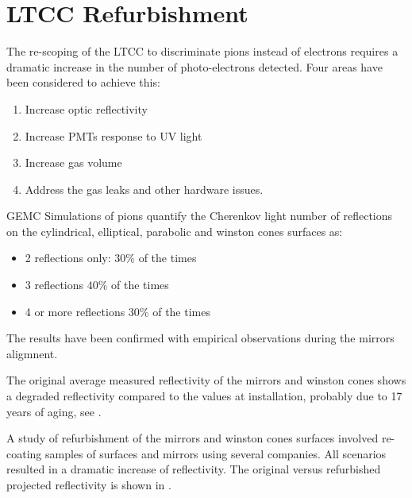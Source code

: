 \section{LTCC Refurbishment}


The re-scoping of the LTCC to discriminate pions instead of electrons requires a dramatic increase in the
number of photo-electrons detected. Four areas have been considered to achieve this:

\begin{enumerate}
	\item Increase optic reflectivity
	\item Increase PMTs response to UV light
	\item Increase gas volume
	\item Address the gas leaks and other hardware issues.
\end{enumerate}


GEMC Simulations of pions quantify the Cherenkov light number of reflections on the cylindrical, elliptical,
parabolic and winston cones surfaces as:

\begin{itemize}
	\item 2 reflections only: $30\%$ of the times
	\item 3 reflections $40\%$ of the times
	\item 4 or more reflections $30\%$ of the times
\end{itemize}

The results have been confirmed with empirical observations during the mirrors aligmnent.

The original average measured reflectivity of the mirrors and winston cones
shows a degraded reflectivity compared to the values at installation, probably due to  17 years of aging, see .

A study of refurbishment of the mirrors and winston cones surfaces
involved re-coating samples of surfaces and mirrors using several companies.
All scenarios resulted in a dramatic increase of reflectivity. The original versus refurbished projected
reflectivity is shown in .

